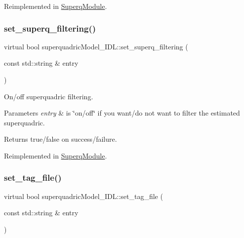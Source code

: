 Reimplemented in \mbox{\hyperlink{classSuperqModule_a90826fc53859ecf126f22a2569611b2c}{Superq\+Module}}.

\mbox{\label{classsuperquadricModel__IDL_af418edf09afd9374c5272d018c58e8a7}} 
\subsubsection{\texorpdfstring{set\+\_\+superq\+\_\+filtering()}{set\_superq\_filtering()}}
{\footnotesize\ttfamily virtual bool superquadric\+Model\+\_\+\+I\+D\+L\+::set\+\_\+superq\+\_\+filtering (\begin{DoxyParamCaption}\item[{const std\+::string \&}]{entry }\end{DoxyParamCaption})\hspace{0.3cm}{\ttfamily [virtual]}}



On/off superquadric filtering. 


\begin{DoxyParams}{Parameters}
{\em entry} & is \char`\"{}on/off\char`\"{} if you want/do not want to filter the estimated superquadric. \\
\hline
\end{DoxyParams}
\begin{DoxyReturn}{Returns}
true/false on success/failure. 
\end{DoxyReturn}


Reimplemented in \mbox{\hyperlink{classSuperqModule_a902d4a48d1a919ff9d9b1f7d1c132577}{Superq\+Module}}.

\mbox{\label{classsuperquadricModel__IDL_a781426bfc4862e87ef75a4bbbfa33275}} 
\subsubsection{\texorpdfstring{set\+\_\+tag\+\_\+file()}{set\_tag\_file()}}
{\footnotesize\ttfamily virtual bool superquadric\+Model\+\_\+\+I\+D\+L\+::set\+\_\+tag\+\_\+file (\begin{DoxyParamCaption}\item[{const std\+::string \&}]{entry }\end{DoxyParamCaption})\hspace{0.3cm}{\ttfamily [virtual]}}



